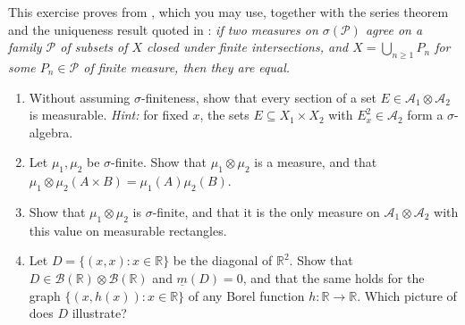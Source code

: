 
\begin{exercise}\label{ex:pm-product-measure}
\medium This exercise proves  from
, which you may use, together with the series theorem
 and the uniqueness result quoted in
: \emph{if two measures on $\sigma(\mathcal P)$ agree on
a family $\mathcal P$ of subsets of $X$ closed under finite intersections, and
$X=\bigcup_{n\ge1}P_n$ for some $P_n\in\mathcal P$ of finite measure, then they are equal.}
\begin{enumerate}[label=(\alph*)]
  \item Without assuming $\sigma$-finiteness, show that every section of a set
    $E\in\mathcal A_1\otimes\mathcal A_2$ is measurable. \emph{Hint:} for fixed $x$, the sets
    $E\subseteq X_1\times X_2$ with $E^2_x\in\mathcal A_2$ form a $\sigma$-algebra.
  \item Let $\mu_1,\mu_2$ be $\sigma$-finite. Show that $\mu_1\otimes\mu_2$ is a measure, and
    that $\mu_1\otimes\mu_2(A\times B)=\mu_1(A)\mu_2(B)$.
  \item Show that $\mu_1\otimes\mu_2$ is $\sigma$-finite, and that it is the only measure on
    $\mathcal A_1\otimes\mathcal A_2$ with this value on measurable rectangles.
  \item Let $D=\{(x,x):x\in\mathbb R\}$ be the diagonal of $\mathbb R^2$. Show that
    $D\in\mathcal B(\mathbb R)\otimes\mathcal B(\mathbb R)$ and $\underline m(D)=0$, and that
    the same holds for the graph $\{(x,h(x)):x\in\mathbb R\}$ of any Borel function
    $h:\mathbb R\to\mathbb R$. Which picture of  does $D$ illustrate?
\end{enumerate}
\end{exercise}

